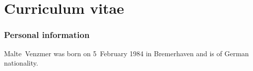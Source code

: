 
\chapter*{Curriculum vitae}

% 
% 
% 


\vspace{2\baselineskip}

\subsection*{Personal information}
Malte~Venzmer was born on 5~February 1984 in Bremerhaven and is of German nationality.

